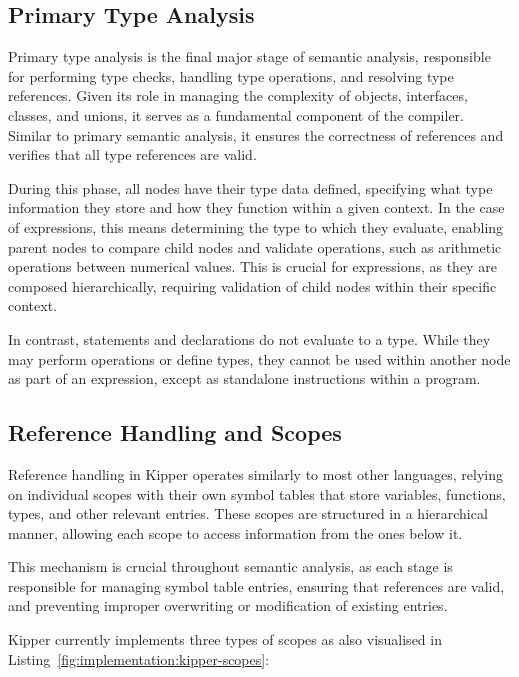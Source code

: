 \subsection{Primary Type Analysis}
\label{sec:primary-type-analysis}

Primary type analysis is the final major stage of semantic analysis, responsible for performing type checks, handling type operations, and resolving type references. Given its role in managing the complexity of objects, interfaces, classes, and unions, it serves as a fundamental component of the compiler. Similar to primary semantic analysis, it ensures the correctness of references and verifies that all type references are valid.

During this phase, all nodes have their type data defined, specifying what type information they store and how they function within a given context. In the case of expressions, this means determining the type to which they evaluate, enabling parent nodes to compare child nodes and validate operations, such as arithmetic operations between numerical values. This is crucial for expressions, as they are composed hierarchically, requiring validation of child nodes within their specific context.

In contrast, statements and declarations do not evaluate to a type. While they may perform operations or define types, they cannot be used within another node as part of an expression, except as standalone instructions within a program.

\subsection{Reference Handling and Scopes}
\label{sec:reference-handling-and-scopes}

Reference handling in Kipper operates similarly to most other languages, relying on individual scopes with their own symbol tables that store variables, functions, types, and other relevant entries. These scopes are structured in a hierarchical manner, allowing each scope to access information from the ones below it.

This mechanism is crucial throughout semantic analysis, as each stage is responsible for managing symbol table entries, ensuring that references are valid, and preventing improper overwriting or modification of existing entries.

Kipper currently implements three types of scopes as also visualised in Listing~\ref{fig:implementation:kipper-scopes}:

